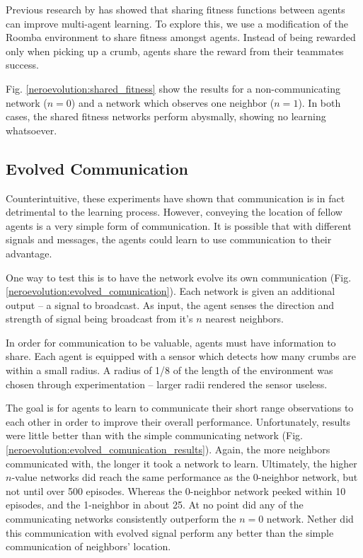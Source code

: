 \documentclass[conference]{IEEEtran}
\begin{document}
Previous research by \cite{rajagopalan2011role} has showed that sharing fitness functions between agents can improve multi-agent learning. 
To explore this, we use a modification of the Roomba environment to share fitness amongst agents. Instead of being rewarded only when picking up a crumb, agents share the reward from their teammates success. 

Fig. \ref{neroevolution:shared_fitness} show the results for a non-communicating network ($n=0$) and a network which observes one neighbor ($n=1$). In both cases, the shared fitness networks perform abysmally, showing no learning whatsoever.


\subsection{Evolved Communication}

Counterintuitive, these experiments have shown that communication is in fact detrimental to the learning process.
However, conveying the location of fellow agents is a very simple form of communication. It is possible that with different signals and messages, the agents could learn to use communication to their advantage.

One way to test this is to have the network evolve its own communication (Fig. \ref{neroevolution:evolved_comunication}). Each network is given an additional output -- a signal to broadcast. As input, the agent senses the direction and strength of signal being broadcast from it's $n$ nearest neighbors. 

In order for communication to be valuable, agents must have information to share. 
Each agent is equipped with a sensor which detects how many crumbs are within a small radius. A radius of 1/8 of the length of the environment was chosen through experimentation -- larger radii rendered the sensor useless.



The goal is for agents to learn to communicate their short range observations to each other in order to improve their overall performance.
Unfortunately, results were little better than with the simple communicating network (Fig. \ref{neroevolution:evolved_comunication_results}). 
Again, the more neighbors communicated with, the longer it took a network to learn. Ultimately, the higher $n$-value networks did reach the same performance as the 0-neighbor network, but not until over 500 episodes. Whereas the 0-neighbor network peeked within 10 episodes, and the 1-neighbor in about 25. At no point did any of the communicating networks consistently outperform the $n=0$ network. Nether did this communication with evolved signal perform any better than the simple communication of neighbors' location. 
\end{document}
